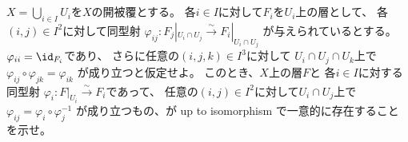 \documentclass[uplatex,dvipdfmx]{jsarticle}
\begin{document}
\maketitle
\HeaderCommentA
\section{}

\fi


\begin{prob}\label{2.14}
  \(X = \bigcup_{i\in I}U_i\)を\(X\)の開被覆とする。
  各\(i\in I\)に対して\(F_i\)を\(U_i\)上の層として、
  各\((i,j)\in I^2\)に対して同型射
  \(\varphi_{ij}:F_j|_{U_i\cap U_j} \xrightarrow{\sim} F_i|_{U_i\cap U_j}\)
  が与えられているとする。
  \(\varphi_{ii}=\id_{F_i}\)であり、
  さらに任意の\((i,j,k)\in I^3\)に対して
  \(U_i\cap U_j\cap U_k\)上で
  \(\varphi_{ij}\circ \varphi_{jk}=\varphi_{ik}\)
  が成り立つと仮定せよ。
  このとき、\(X\)上の層\(F\)と
  各\(i\in I\)に対する同型射
  \(\varphi_i:F|_{U_i}\xrightarrow{\sim} F_i\)であって、
  任意の\((i,j)\in I^2\)に対して\(U_i\cap U_j\)上で
  \(\varphi_{ij} = \varphi_i\circ \varphi_j^{-1}\)
  が成り立つもの、が up to isomorphism で一意的に存在することを示せ。
\end{prob}
\end{document}

